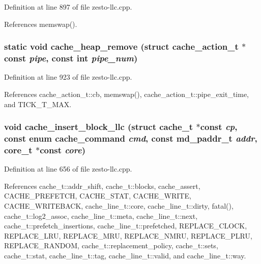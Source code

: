 Definition at line 897 of file zesto-llc.cpp.

References memswap().
\subsubsection[{cache\_\-heap\_\-remove}]{\setlength{\rightskip}{0pt plus 5cm}static void cache\_\-heap\_\-remove (struct {\bf cache\_\-action\_\-t} $\ast$const  {\em pipe}, \/  const int {\em pipe\_\-num})\hspace{0.3cm}{\tt  [static]}}\label{zesto-llc_8cpp_672e06f81a893ac6af2c4fd4948069ed}




Definition at line 923 of file zesto-llc.cpp.

References cache\_\-action\_\-t::cb, memswap(), cache\_\-action\_\-t::pipe\_\-exit\_\-time, and TICK\_\-T\_\-MAX.
\subsubsection[{cache\_\-insert\_\-block\_\-llc}]{\setlength{\rightskip}{0pt plus 5cm}void cache\_\-insert\_\-block\_\-llc (struct {\bf cache\_\-t} $\ast$const  {\em cp}, \/  const enum {\bf cache\_\-command} {\em cmd}, \/  const {\bf md\_\-paddr\_\-t} {\em addr}, \/  {\bf core\_\-t} $\ast$const  {\em core})}\label{zesto-llc_8cpp_e7c14fa8601433a16fa1cd5f91e64c7c}




Definition at line 656 of file zesto-llc.cpp.

References cache\_\-t::addr\_\-shift, cache\_\-t::blocks, cache\_\-assert, CACHE\_\-PREFETCH, CACHE\_\-STAT, CACHE\_\-WRITE, CACHE\_\-WRITEBACK, cache\_\-line\_\-t::core, cache\_\-line\_\-t::dirty, fatal(), cache\_\-t::log2\_\-assoc, cache\_\-line\_\-t::meta, cache\_\-line\_\-t::next, cache\_\-t::prefetch\_\-insertions, cache\_\-line\_\-t::prefetched, REPLACE\_\-CLOCK, REPLACE\_\-LRU, REPLACE\_\-MRU, REPLACE\_\-NMRU, REPLACE\_\-PLRU, REPLACE\_\-RANDOM, cache\_\-t::replacement\_\-policy, cache\_\-t::sets, cache\_\-t::stat, cache\_\-line\_\-t::tag, cache\_\-line\_\-t::valid, and cache\_\-line\_\-t::way.

